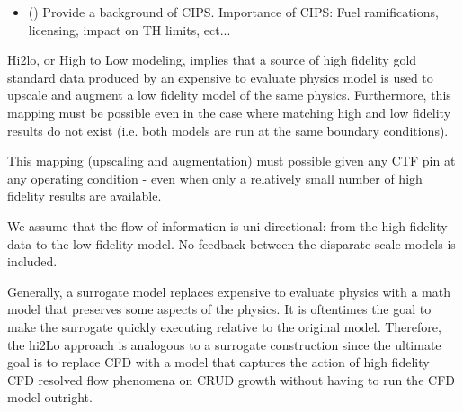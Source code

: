 \begin{itemize}
    \item (\checkmark) Provide a background of CIPS.  Importance of CIPS:  Fuel ramifications, licensing, impact on TH limits, ect...
\end{itemize}

Hi2lo, or High to Low modeling, implies that a source of high fidelity gold standard data produced by an expensive to evaluate physics model is used to upscale and augment a low fidelity model of the same physics.
Furthermore, this mapping must be possible even in the case where matching high and low fidelity results do not exist (i.e. both models are run at the same boundary conditions).

This mapping (upscaling and augmentation) must possible given any CTF pin at any operating condition - even when only a relatively small number of high fidelity results are available.

We assume that the flow of information is uni-directional: from the high fidelity data to the low fidelity model.  No feedback between the disparate scale models is included.

Generally, a surrogate model replaces expensive to evaluate physics with a math model that preserves some aspects of the physics.  It is oftentimes the goal to make the surrogate quickly executing relative to the original model. Therefore, the hi2Lo approach is analogous to a surrogate construction since the ultimate goal is to replace CFD with a model that captures the action of high fidelity CFD resolved flow phenomena on CRUD growth without having to run the CFD model outright.


